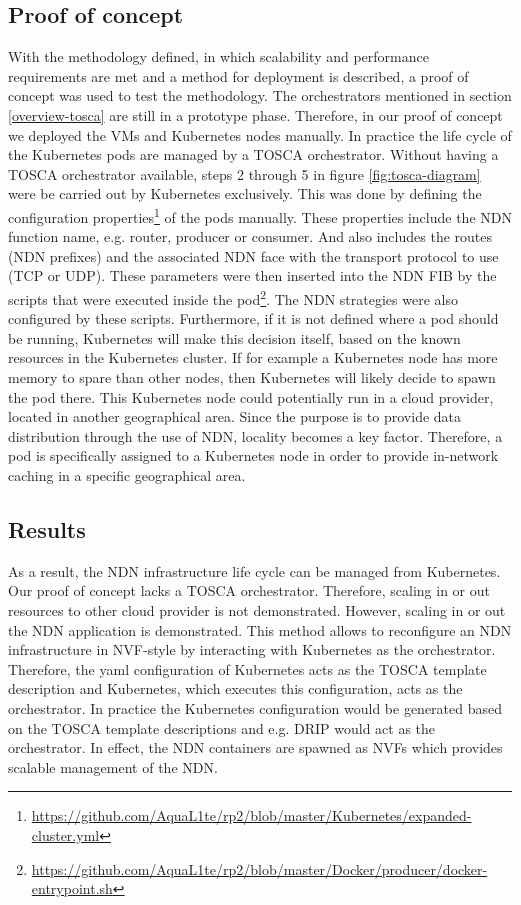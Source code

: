 \subsection{Proof of concept}
\label{planning-poc}
With the methodology defined, in which scalability and performance requirements are met and a method for deployment is described, a proof of concept was used to test the methodology. The orchestrators mentioned in section \ref{overview-tosca} are still in a prototype phase. Therefore, in our proof of concept we deployed the VMs and Kubernetes nodes manually. In practice the life cycle of the Kubernetes pods are managed by a TOSCA orchestrator. Without having a TOSCA orchestrator available, steps 2 through 5 in figure \ref{fig:tosca-diagram} were be carried out by Kubernetes exclusively. This was done by defining the configuration properties\footnote{\url{https://github.com/AquaL1te/rp2/blob/master/Kubernetes/expanded-cluster.yml}} of the pods manually. These properties include the NDN function name, e.g. router, producer or consumer. And also includes the routes (NDN prefixes) and the associated NDN face with the transport protocol to use (TCP or UDP). These parameters were then inserted into the NDN FIB by the scripts that were executed inside the pod\footnote{\url{https://github.com/AquaL1te/rp2/blob/master/Docker/producer/docker-entrypoint.sh}}. The NDN strategies were also configured by these scripts. Furthermore, if it is not defined where a pod should be running, Kubernetes will make this decision itself, based on the known resources in the Kubernetes cluster. If for example a Kubernetes node has more memory to spare than other nodes, then Kubernetes will likely decide to spawn the pod there. This Kubernetes node could potentially run in a cloud provider, located in another geographical area. Since the purpose is to provide data distribution through the use of NDN, locality becomes a key factor. Therefore, a pod is specifically assigned to a Kubernetes node in order to provide in-network caching in a specific geographical area.

\subsection{Results}
As a result, the NDN infrastructure life cycle can be managed from Kubernetes. Our proof of concept lacks a TOSCA orchestrator. Therefore, scaling in or out resources to other cloud provider is not demonstrated. However, scaling in or out the NDN application is demonstrated. This method allows to reconfigure an NDN infrastructure in NVF-style by interacting with Kubernetes as the orchestrator. Therefore, the \gls{yaml} configuration of Kubernetes acts as the TOSCA template description and Kubernetes, which executes this configuration, acts as the orchestrator. In practice the Kubernetes configuration would be generated based on the TOSCA template descriptions and e.g. DRIP would act as the orchestrator. In effect, the NDN containers are spawned as NVFs which provides scalable management of the NDN.